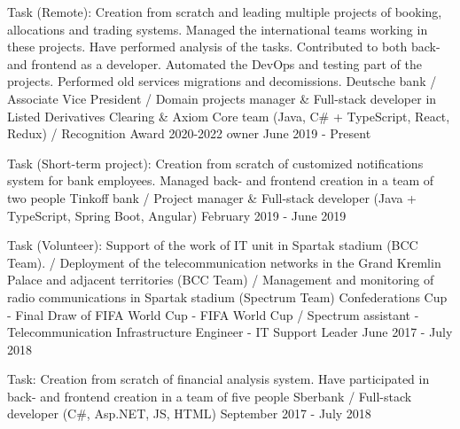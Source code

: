 

\vspace{0cm}\begin{cventries}
\cventry
{Task (Remote): Creation from scratch and leading multiple projects of booking, allocations and trading systems. Managed the international teams working in these projects. Have performed analysis of the tasks. Contributed to both back- and frontend as a developer. Automated the DevOps and testing part of the projects. Performed old services migrations and decomissions. 
} %
{Deutsche bank / Associate Vice President / Domain projects manager \& Full-stack developer in Listed Derivatives Clearing \& Axiom Core team (Java, C\# + TypeScript, React, Redux) / Recognition Award 2020-2022 owner} %
{} %
{June 2019 - Present} %
\noindent	
	
\cventry
{Task (Short-term project): Creation from scratch of customized notifications system for bank employees. Managed back- and frontend creation in a team of two people} %
{Tinkoff bank / Project manager \& Full-stack developer (Java + TypeScript, Spring Boot, Angular)} %
{} %
{February 2019 - June 2019} %
\noindent	
	
\cventry
{Task (Volunteer): Support of the work of IT unit in Spartak stadium (BCC Team). /
Deployment of the telecommunication networks in the Grand Kremlin Palace and adjacent territories (BCC Team) /
Management and monitoring of radio communications in Spartak stadium (Spectrum Team)} %
{Confederations Cup - Final Draw of FIFA World Cup - FIFA World Cup / 
	Spectrum assistant - Telecommunication Infrastructure Engineer  - IT Support Leader} %
{} %
{June 2017 - July 2018} %
\noindent	

\cventry
{Task: Creation from scratch of financial analysis system. Have participated in back- and frontend creation in a team of five people} %
{Sberbank / Full-stack developer (C\#, Asp.NET, JS, HTML)} %
{} %
{September 2017 - July 2018} %
\noindent	


\end{cventries}
